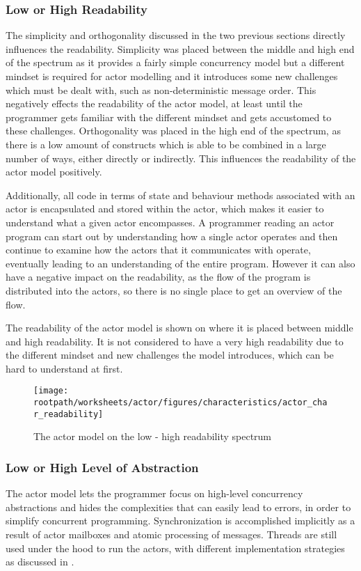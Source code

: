 \subsubsection{Low or High Readability}
The simplicity and orthogonality discussed in the two previous sections directly influences the readability. Simplicity was placed between the middle and high end of the spectrum as it provides a fairly simple concurrency model but a different mindset is required for actor modelling and it introduces some new challenges which must be dealt with, such as non-deterministic message order. This negatively effects the readability of the actor model, at least until the programmer gets familiar with the different mindset and gets accustomed to these challenges. Orthogonality was placed in the high end of the spectrum, as there is a low amount of constructs which is able to be combined in a large number of ways, either directly or indirectly. This influences the readability of the actor model positively.

Additionally, all code in terms of state and behaviour methods associated with an actor is encapsulated and stored within the actor, which makes it easier to understand what a given actor encompasses. A programmer reading an actor program can start out by understanding how a single actor operates and then continue to examine how the actors that it communicates with operate, eventually leading to an understanding of the entire program. However it can also have a negative impact on the readability, as the flow of the program is distributed into the actors, so there is no single place to get an overview of the flow.

The readability of the actor model is shown on  where it is placed between middle and high readability. It is not considered to have a very high readability due to the different mindset and new challenges the model introduces, which can be hard to understand at first.

\begin{figure}[htbp]
\centering
 \texttt{[image: \\rootpath/worksheets/actor/figures/characteristics/actor\_char\_readability]} 
 \caption{The actor model on the low - high readability spectrum}
\label{fig:actor_readability}
\end{figure}

\subsubsection{Low or High Level of Abstraction}\label{sec:actor_level_of_abstraction}
The actor model lets the programmer focus on high-level concurrency abstractions and hides the complexities that can easily lead to errors, in order to simplify concurrent programming. Synchronization is accomplished implicitly as a result of actor mailboxes and atomic processing of messages. Threads are still used under the hood to run the actors, with different implementation strategies as discussed in .

